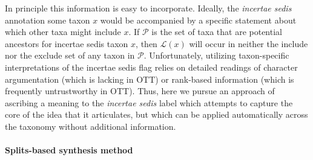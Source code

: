 \documentclass[english]{article}
\begin{document}
In principle this information is easy to incorporate.
Ideally, the \emph{incertae sedis}
annotation some taxon $x$ would be accompanied by a specific
statement about which other taxa might include $x$.
If $\mathcal{P}$ is the set of taxa that are potential ancestors for
incertae sedis taxon $x$, then $\mathcal{L}(x)$ will occur in neither
the include nor the exclude set of any taxon in $\mathcal{P}$.
Unfortunately, utilizing taxon-specific interpretations of the
incertae sedis flag relies on detailed readings of character argumentation
(which is lacking in OTT) or rank-based information (which is frequently
untrustworthy in OTT).
Thus, here we pursue an approach of ascribing a
meaning to the \emph{incertae sedis} label which attempts to capture
the core of the idea that it articulates, but which can be applied
automatically across the taxonomy without additional information.

\paragraph{Splits-based synthesis method}

 
\end{document}

